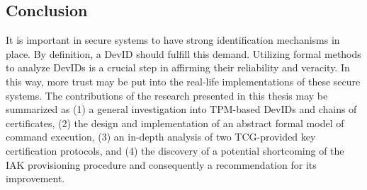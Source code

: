 \documentclass[runningheads]{llncs}
\begin{document}
\subsection{Conclusion}
It is important in secure systems to have strong identification mechanisms in place. By definition, a DevID should fulfill this demand. Utilizing formal methods to analyze DevIDs is a crucial step in affirming their reliability and veracity. In this way, more trust may be put into the real-life implementations of these secure systems.
The contributions of the research presented in this thesis may be summarized as (1) a general investigation into TPM-based DevIDs and chains of certificates, (2) the design and implementation of an abstract formal model of command execution, (3) an in-depth analysis of two TCG-provided key certification protocols, and (4) the discovery of a potential shortcoming of the IAK provisioning procedure and consequently a recommendation for its improvement.
\end{document}
